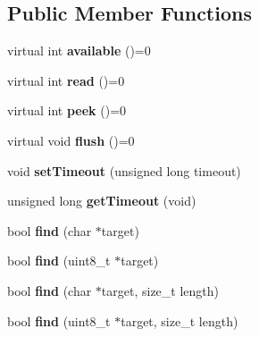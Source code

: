 \subsection*{Public Member Functions}
\begin{DoxyCompactItemize}
\item 
virtual int {\bfseries available} ()=0\hypertarget{class_stream_a9c98a763395005c08ce95afb2f06c7b1}{}\label{class_stream_a9c98a763395005c08ce95afb2f06c7b1}

\item 
virtual int {\bfseries read} ()=0\hypertarget{class_stream_aea5dee9fcb038148515b7c9212d38dc0}{}\label{class_stream_aea5dee9fcb038148515b7c9212d38dc0}

\item 
virtual int {\bfseries peek} ()=0\hypertarget{class_stream_a30c3c212ec6ea67277a708c5ea2501a5}{}\label{class_stream_a30c3c212ec6ea67277a708c5ea2501a5}

\item 
virtual void {\bfseries flush} ()=0\hypertarget{class_stream_aa3ef2c34f152a0b2ea8de9139b9461da}{}\label{class_stream_aa3ef2c34f152a0b2ea8de9139b9461da}

\item 
void {\bfseries set\+Timeout} (unsigned long timeout)\hypertarget{class_stream_a851dd6dc74d52389de04f99648478db5}{}\label{class_stream_a851dd6dc74d52389de04f99648478db5}

\item 
unsigned long {\bfseries get\+Timeout} (void)\hypertarget{class_stream_abc982d9972a4c7fdabcf7ba9ab325ed1}{}\label{class_stream_abc982d9972a4c7fdabcf7ba9ab325ed1}

\item 
bool {\bfseries find} (char $\ast$target)\hypertarget{class_stream_a4bab30ccd324efd461dee46a2339f673}{}\label{class_stream_a4bab30ccd324efd461dee46a2339f673}

\item 
bool {\bfseries find} (uint8\+\_\+t $\ast$target)\hypertarget{class_stream_a250f5e805979bad3efb0ef33038de457}{}\label{class_stream_a250f5e805979bad3efb0ef33038de457}

\item 
bool {\bfseries find} (char $\ast$target, size\+\_\+t length)\hypertarget{class_stream_ad851401f2318cdb1de05707e021b81d9}{}\label{class_stream_ad851401f2318cdb1de05707e021b81d9}

\item 
bool {\bfseries find} (uint8\+\_\+t $\ast$target, size\+\_\+t length)\hypertarget{class_stream_abe254745b98af8037d10fef6126e42df}{}\label{class_stream_abe254745b98af8037d10fef6126e42df}


\end{DoxyCompactItemize}
